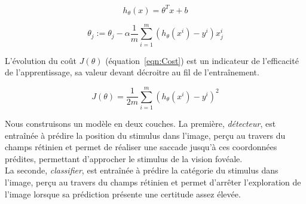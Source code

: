 \begin{equation}
h_{\theta}(x) = \theta^{T}x + b
\label{eqn:Hypo}
\end{equation}

\begin{equation}
\theta_j := \theta_j - \alpha \frac{1}{m} \sum_{i=1}^m (h_\theta(x^i) - y^i)x_{j}^i
\label{eqn:Grad_desc}
\end{equation}

L'évolution du coût $J(\theta)$ (équation~\ref{eqn:Cost}) est un indicateur de l'efficacité de l'apprentissage, sa valeur devant décroitre au fil de l'entraînement.

\begin{equation}
J(\theta) = \frac{1}{2m} \sum_{i=1}^m (h_\theta(x^i)-y^i)^2
\label{eqn:Cost}
\end{equation}

Nous construisons un modèle en deux couches. La première, \textit{détecteur}, est entraînée à prédire la position du stimulus dans l'image, perçu au travers du champs rétinien et permet de réaliser une saccade jusqu'à ces coordonnées prédites, permettant d'approcher le stimulus de la vision fovéale. \\
La seconde, \textit{classifier}, est entraînée à prédire la catégorie du stimulus dans l'image, perçu au travers du champs rétinien et permet d'arrêter l'exploration de l'image lorsque sa prédiction présente une certitude assez élevée.